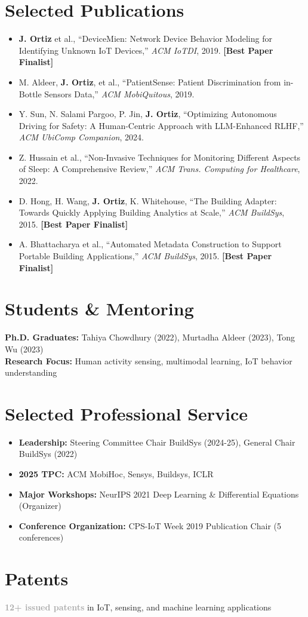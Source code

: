 \documentclass[11pt]{article}
\begin{document}
\section{Selected Publications}
\begin{itemize}
\item \textbf{J. Ortiz} et al., ``DeviceMien: Network Device Behavior Modeling for Identifying Unknown IoT Devices,'' \textit{ACM IoTDI}, 2019. \textbf{\textcolor{mBlue}{[Best Paper Finalist]}}
\item M. Aldeer, \textbf{J. Ortiz}, et al., ``PatientSense: Patient Discrimination from in-Bottle Sensors Data,'' \textit{ACM MobiQuitous}, 2019.
\item Y. Sun, N. Salami Pargoo, P. Jin, \textbf{J. Ortiz}, ``Optimizing Autonomous Driving for Safety: A Human-Centric Approach with LLM-Enhanced RLHF,'' \textit{ACM UbiComp Companion}, 2024.
\item Z. Hussain et al., ``Non-Invasive Techniques for Monitoring Different Aspects of Sleep: A Comprehensive Review,'' \textit{ACM Trans. Computing for Healthcare}, 2022.
\item D. Hong, H. Wang, \textbf{J. Ortiz}, K. Whitehouse, ``The Building Adapter: Towards Quickly Applying Building Analytics at Scale,'' \textit{ACM BuildSys}, 2015. \textbf{\textcolor{mBlue}{[Best Paper Finalist]}}
\item A. Bhattacharya et al., ``Automated Metadata Construction to Support Portable Building Applications,'' \textit{ACM BuildSys}, 2015. \textbf{\textcolor{mBlue}{[Best Paper Finalist]}}
\end{itemize}

\section{Students \& Mentoring}
\textbf{\textcolor{mBlue}{Ph.D. Graduates:}} Tahiya Chowdhury (2022), Murtadha Aldeer (2023), Tong Wu (2023)\\[1mm]
\textbf{\textcolor{mBlue}{Research Focus:}} Human activity sensing, multimodal learning, IoT behavior understanding

\section{Selected Professional Service}
\begin{itemize}
\item \textbf{\textcolor{mBlue}{Leadership:}} Steering Committee Chair BuildSys (2024-25), General Chair BuildSys (2022)
\item \textbf{\textcolor{mBlue}{2025 TPC:}} ACM MobiHoc, Sensys, Buildsys, ICLR
\item \textbf{\textcolor{mBlue}{Major Workshops:}} NeurIPS 2021 Deep Learning \& Differential Equations (Organizer)
\item \textbf{\textcolor{mBlue}{Conference Organization:}} CPS-IoT Week 2019 Publication Chair (5 conferences)
\end{itemize}

\section{Patents}
\begin{center}
\textbf{\textcolor{darkGray}{12+ issued patents}} in IoT, sensing, and machine learning applications
\end{center}
\end{document}
